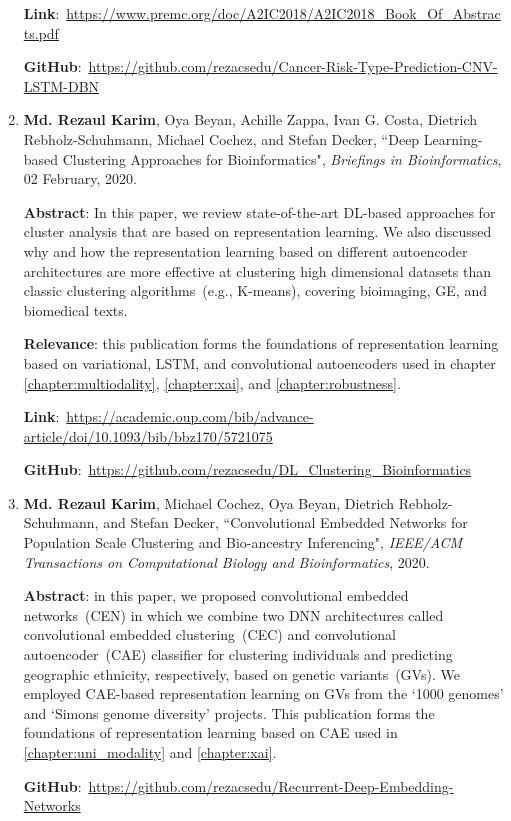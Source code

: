 \begin{enumerate}
	\textbf{Link}:~\url{https://www.premc.org/doc/A2IC2018/A2IC2018_Book_Of_Abstracts.pdf}
	
	\textbf{GitHub}:~\url{https://github.com/rezacsedu/Cancer-Risk-Type-Prediction-CNV-LSTM-DBN}
	
	\item \textbf{Md. Rezaul Karim}, Oya Beyan, Achille Zappa, Ivan G. Costa, Dietrich Rebholz-Schuhmann, Michael Cochez, and Stefan Decker, ``Deep Learning-based Clustering Approaches for Bioinformatics", \emph{Briefings in Bioinformatics}, 02 February, 2020.
	
	\textbf{Abstract}: In this paper, we review state-of-the-art DL-based approaches for cluster analysis that are based on representation learning. We also discussed why and how the representation learning based on different autoencoder architectures are more effective at clustering high dimensional datasets than classic clustering algorithms~(e.g., K-means), covering bioimaging, GE, and biomedical texts. 
	
	\textbf{Relevance}: this publication forms the foundations of representation learning based on variational, LSTM, and convolutional autoencoders used in chapter \ref{chapter:multiodality}, \ref{chapter:xai}, and \ref{chapter:robustness}.

	\textbf{Link}:~\url{https://academic.oup.com/bib/advance-article/doi/10.1093/bib/bbz170/5721075}
	
	\textbf{GitHub}:~\url{https://github.com/rezacsedu/DL_Clustering_Bioinformatics}
	
	\item \textbf{Md. Rezaul Karim}, Michael Cochez, Oya Beyan, Dietrich Rebholz-Schuhmann, and Stefan Decker, ``Convolutional Embedded Networks for Population Scale Clustering and Bio-ancestry Inferencing", \emph{IEEE/ACM Transactions on Computational Biology and Bioinformatics}, 2020.
	
	\textbf{Abstract}: in this paper, we proposed convolutional embedded networks~(CEN) in which we combine two DNN architectures called convolutional embedded clustering~(CEC) and convolutional autoencoder~(CAE) classifier for clustering individuals and predicting geographic ethnicity, respectively, based on genetic variants~(GVs). We employed CAE-based representation learning on GVs from the `1000 genomes' and `Simons genome diversity' projects. This publication forms the foundations of representation learning based on CAE used in \cref{chapter:uni_modality} and \cref{chapter:xai}.

	\textbf{GitHub}:~\url{https://github.com/rezacsedu/Recurrent-Deep-Embedding-Networks}
	

\end{enumerate}
